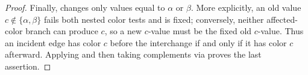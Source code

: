 \begin{proof}
Finally,  changes only values equal to
\(\alpha\) or \(\beta\).  More explicitly, an old value
\(c\notin\{\alpha,\beta\}\) fails both nested color tests and is fixed;
conversely, neither affected-color branch can produce \(c\), so a new
\(c\)-value must be the fixed old \(c\)-value.  Thus an incident edge
has color \(c\) before the interchange if and only if it has color
\(c\) afterward.  Applying  and then taking
complements via  proves the last assertion.
\end{proof}
